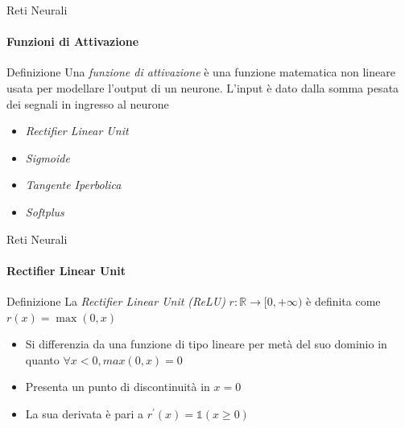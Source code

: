 \documentclass[
 ]{beamer}
\begin{document}
\begin{frame}{Reti Neurali}
    \framesubtitle{Funzioni di Attivazione}
    \begin{block}{Definizione} 
        \large Una \emph{funzione di attivazione} è una funzione matematica non lineare usata per modellare l'output di un neurone. L'input è dato dalla somma pesata dei segnali in ingresso al neurone
    \end{block}\pause
    
    \bigskip
    
    \begin{itemize} [<+->]
        \setlength\itemsep{1.5em}
        \item \emph{\large Rectifier Linear Unit}
        \item \emph{\large Sigmoide}
        \item \emph{\large Tangente Iperbolica}
        \item \emph{\large Softplus}
    \end{itemize}
\end{frame}

\begin{frame}{Reti Neurali}
    \framesubtitle{Rectifier Linear Unit}
    \begin{block}{Definizione} 
        \large La \emph{Rectifier Linear Unit (ReLU)} $r: \mathbb{R} \rightarrow [0, +\infty)$ è definita come $r(x) = \max(0,x)$  
    \end{block}\pause
    
    \bigskip
    
    \begin{itemize} [<+->]
        \setlength\itemsep{2em}
        \item \large Si differenzia da una funzione di tipo lineare per metà del suo dominio in quanto $\forall x < 0, max(0,x) = 0$
        \item \large Presenta un punto di discontinuità in $x = 0$
        \item \large La sua derivata è pari a $r^{\prime}(x) = \mathds{1}(x \geq 0)$
    \end{itemize}
\end{frame}
\end{document}
